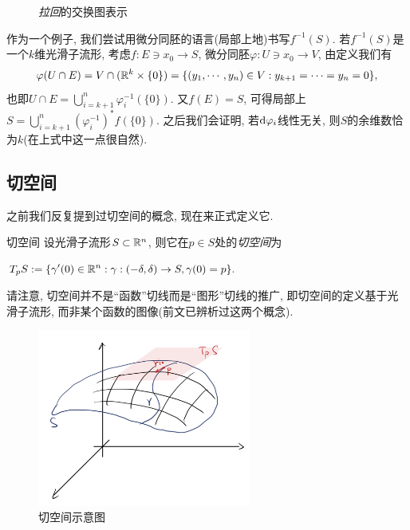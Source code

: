 \begin{figure}[H]
	\centering
	\caption{\textit{拉回}的交换图表示}
\end{figure}

作为一个例子, 我们尝试用微分同胚的语言(局部上地)书写$f^{-1}(S)$. 若$f^{-1}(S)$是一个$k$维光滑子流形, 考虑$f:E \ni x_0 \to S$, 微分同胚$\varphi :U \ni x_0 \to V$, 由定义我们有$$\varphi (U \cap E) =  V \cap (\mathbb{R} ^k \times \{ 0 \}) = \{ (y_1,\cdots ,y_n) \in V:y_{k+1} = \cdots = y_n = 0 \},$$
也即$U \cap E = \bigcup_{i=k+1}^{n} \varphi ^{-1}_i(\{0\}) $. 又$f(E) = S$, 可得局部上$S = \bigcup_{i=k+1}^{n} (\varphi ^{-1}_i) ^* f(\{0\})$. 之后我们会证明, 若$\mathop{}\!\mathrm{d} \varphi _i$线性无关, 则$S$的余维数恰为$k$(在上式中这一点很自然). 

\subsection{切空间}

之前我们反复提到过切空间的概念, 现在来正式定义它. 

\begin{definition}{切空间}
	设光滑子流形$S \subset \mathbb{R} ^n$, 则它在$p \in S$处的\textit{切空间}为
	\begin{center}
		$\displaystyle T_pS := \{ \gamma '(0) \in \mathbb{R} ^n:\gamma : (-\delta ,\delta) \to S, \gamma (0) = p \}.$
	\end{center}
\end{definition}
\begin{remark}
	请注意, 切空间并不是“函数”切线而是“图形”切线的推广, 即切空间的定义基于光滑子流形, 而非某个函数的图像(前文已辨析过这两个概念). 
\end{remark}

\begin{figure}[H]
	\centering
	\includegraphics[width=7cm]{attachment/IMG_4115.jpeg}
	\caption{切空间示意图}
\end{figure}


